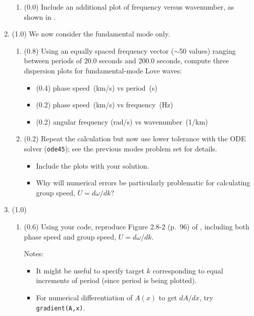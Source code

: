 \documentclass[11pt,titlepage,fleqn]{article}
\begin{document}
\begin{enumerate}
\begin{enumerate}
\item (0.0) Include an additional plot of frequency versus wavenumber, as shown in .
\end{enumerate}


\pagebreak
\item (1.0) We now consider the fundamental mode only.

\begin{enumerate}
\item (0.8) Using an equally spaced frequency vector ($\sim$50 values) ranging between periods of 20.0 seconds and 200.0 seconds, compute three dispersion plots for fundamental-mode Love waves:
%
\begin{itemize}
\item (0.4) phase speed~(km/s) vs period~(s)
\item (0.2) phase speed~(km/s) vs frequency~(Hz)
\item (0.2) angular frequency (rad/s) vs wavenumber~(1/km)
\end{itemize}

\item (0.2) Repeat the calculation but now use lower tolerance with the ODE solver (\verb+ode45+); see the previous modes problem set for details.
%
\begin{itemize}
\item Include the plots with your solution.
\item Why will numerical errors be particularly problematic for calculating group speed, $U = d\omega/dk$?
\end{itemize}

\end{enumerate}


\item (1.0)
%
\begin{enumerate}
\item (0.6) Using your code, reproduce Figure 2.8-2 (p.~96) of \citet{SteinWysession}, including both phase speed and group speed, $U = d\omega/dk$.

Notes:
%
\begin{itemize}
\item It might be useful to specify target $k$ corresponding to equal increments of period (since period is being plotted).
\item For numerical differentiation of $A(x)$ to get $dA/dx$, try \verb+gradient(A,x)+.
\end{itemize}


\end{enumerate}
\end{enumerate}
\end{document}
